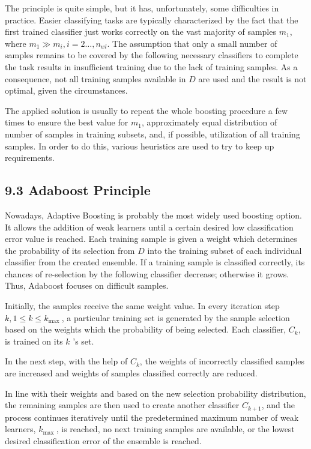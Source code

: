 \documentclass[10pt]{book}
\begin{document}
The principle is quite simple, but it has, unfortunately, some difficulties in practice. Easier classifying tasks are typically characterized by the fact that the first trained classifier just works correctly on the vast majority of samples $m_{1}$, where $m_{1} \gg m_{i}, i=2 \ldots, n_{w l}$. The assumption that only a small number of samples remains to be covered by the following necessary classifiers to complete the task results in insufficient training due to the lack of training samples. As a consequence, not all training samples available in $D$ are used and the result is not optimal, given the circumstances.

The applied solution is usually to repeat the whole boosting procedure a few times to ensure the best value for $m_{1}$, approximately equal distribution of number of samples in training subsets, and, if possible, utilization of all training samples. In order to do this, various heuristics are used to try to keep up requirements.

\subsection*{9.3 Adaboost Principle}
Nowadays, Adaptive Boosting is probably the most widely used boosting option. It allows the addition of weak learners until a certain desired low classification error value is reached. Each training sample is given a weight which determines the probability of its selection from $D$ into the training subset of each individual classifier from the created ensemble. If a training sample is classified correctly, its chances of re-selection by the following classifier decrease; otherwise it grows. Thus, Adaboost focuses on difficult samples.

Initially, the samples receive the same weight value. In every iteration step $k, 1 \leq k \leq k_{\text {max }}$, a particular training set is generated by the sample selection based on the weights which the probability of being selected. Each classifier, $C_{k}$, is trained on its $k$ 's set.

In the next step, with the help of $C_{k}$, the weights of incorrectly classified samples are increased and weights of samples classified correctly are reduced.

In line with their weights and based on the new selection probability distribution, the remaining samples are then used to create another classifier $C_{k+1}$, and the process continues iteratively until the predetermined maximum number of weak learners, $k_{\text {max }}$, is reached, no next training samples are available, or the lowest desired classification error of the ensemble is reached.
\end{document}
